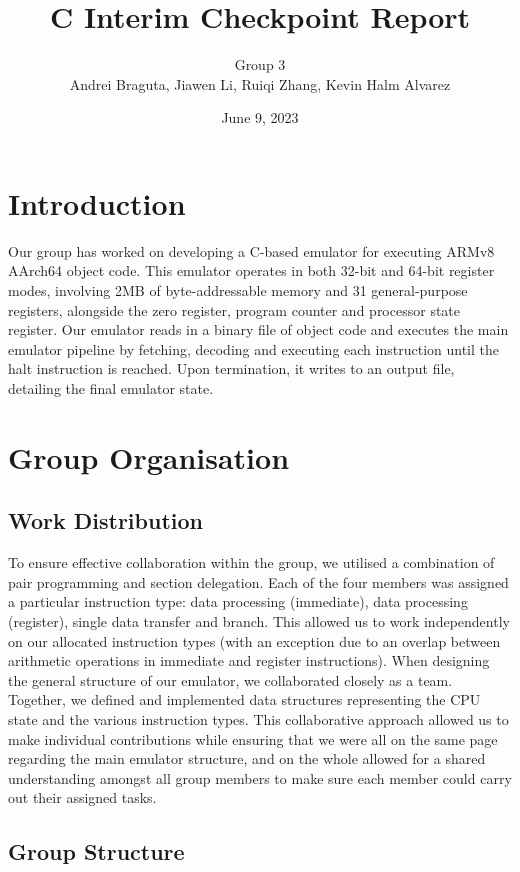 \documentclass{article}
\date{June 9, 2023}
\title{C Interim Checkpoint Report}
\author{Group 3 \\ Andrei Braguta, Jiawen Li, Ruiqi Zhang, Kevin Halm Alvarez}
\begin{document}
\maketitle

\section{Introduction}

Our group has worked on developing a C-based emulator for executing ARMv8
AArch64 object code. This emulator operates in both 32-bit and 64-bit register
modes, involving 2MB of byte-addressable memory and 31 general-purpose
registers, alongside the zero register, program counter and processor state
register. Our emulator reads in a binary file of object code and executes the
main emulator pipeline by fetching, decoding and executing each instruction
until the halt instruction is reached. Upon termination, it writes to an output
file, detailing the final emulator state.

\section{Group Organisation}

\subsection{Work Distribution}

To ensure effective collaboration within the group, we utilised a combination of
pair programming and section delegation. Each of the four members was assigned a
particular instruction type: data processing (immediate), data processing
(register), single data transfer and branch. This allowed us to work
independently on our allocated instruction types (with an exception due to an
overlap between arithmetic operations in immediate and register instructions).
When designing the general structure of our emulator, we collaborated closely as
a team. Together, we defined and implemented data structures representing the
CPU state and the various instruction types. This collaborative approach allowed
us to make individual contributions while ensuring that we were all on the same
page regarding the main emulator structure, and on the whole allowed for a
shared understanding amongst all group members to make sure each member could
carry out their assigned tasks.

\subsection{Group Structure}
\end{document}

